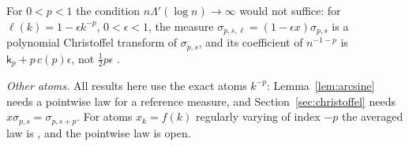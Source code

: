For $0<p<1$ the condition $n\Lambda'(\log n)\to\infty$ would not suffice: for $\ell(k)=1-\epsilon k^{-p}$, $0<\epsilon<1$, the measure
$\sigma_{p,s,\ell}=(1-\epsilon x)\sigma_{p,s}$ is a polynomial Christoffel transform of $\sigma_{p,s}$, and its coefficient of
$n^{-1-p}$ is $\mathsf k_p+p\,c(p)\epsilon$, not $\frac12p\epsilon$ \cite[\S13]{PaperII}.

\emph{Other atoms.} All results here use the exact atoms $k^{-p}$: Lemma~\ref{lem:arcsine} needs a pointwise law for a
reference measure, and Section~\ref{sec:christoffel} needs $x\sigma_{p,s}=\sigma_{p,s+p}$. For atoms $x_k=f(k)$ regularly
varying of index $-p$ the averaged law is \cite[Theorem~1.1]{PaperI}, and the pointwise law is open.
